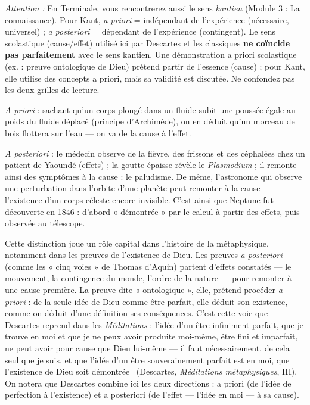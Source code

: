 \documentclass[11pt]{article}
\begin{document}
\begin{attention}
\emph{Attention :} En Terminale, vous rencontrerez aussi le sens \emph{kantien} (Module 3 : La connaissance). Pour Kant, \emph{a priori} = indépendant de l'expérience (nécessaire, universel) ; \emph{a posteriori} = dépendant de l'expérience (contingent). Le sens scolastique (cause/effet) utilisé ici par Descartes et les classiques \textbf{ne coïncide pas parfaitement} avec le sens kantien. Une démonstration a priori scolastique (ex. : preuve ontologique de Dieu) prétend partir de l'essence (cause) ; pour Kant, elle utilise des concepts a priori, mais sa validité est discutée. Ne confondez pas les deux grilles de lecture.
\end{attention}

\begin{exemplebox}
\emph{A priori} : sachant qu'un corps plongé dans un fluide subit une poussée égale au poids du fluide déplacé (principe d'Archimède), on en déduit qu'un morceau de bois flottera sur l'eau — on va de la cause à l'effet.

\emph{A posteriori} : le médecin observe de la fièvre, des frissons et des céphalées chez un patient de Yaoundé (effets) ; la goutte épaisse révèle le \emph{Plasmodium} ; il remonte ainsi des symptômes à la cause : le paludisme. De même, l'astronome qui observe une perturbation dans l'orbite d'une planète peut remonter à la cause — l'existence d'un corps céleste encore invisible. C'est ainsi que Neptune fut découverte en 1846 : d'abord « démontrée » par le calcul à partir des effets, puis observée au télescope.
\end{exemplebox}

Cette distinction joue un rôle capital dans l'histoire de la métaphysique, notamment dans les preuves de l'existence de Dieu. Les preuves \emph{a posteriori} (comme les « cinq voies » de Thomas d'Aquin) partent d'effets constatés — le mouvement, la contingence du monde, l'ordre de la nature — pour remonter à une cause première. La preuve dite « ontologique », elle, prétend procéder \emph{a priori} : de la seule idée de Dieu comme être parfait, elle déduit son existence, comme on déduit d'une définition ses conséquences. C'est cette voie que Descartes reprend dans les \emph{Méditations} : l'idée d'un être infiniment parfait, que je trouve en moi et que je ne peux avoir produite moi-même, être fini et imparfait, ne peut avoir pour cause que Dieu lui-même — \guillemotleft il faut nécessairement, de cela seul que je suis, et que l'idée d'un être souverainement parfait est en moi, que l'existence de Dieu soit démontrée \guillemotright\ (Descartes, \emph{Méditations métaphysiques}, III). On notera que Descartes combine ici les deux directions : a priori (de l'idée de perfection à l'existence) et a posteriori (de l'effet — l'idée en moi — à sa cause).
\end{document}
